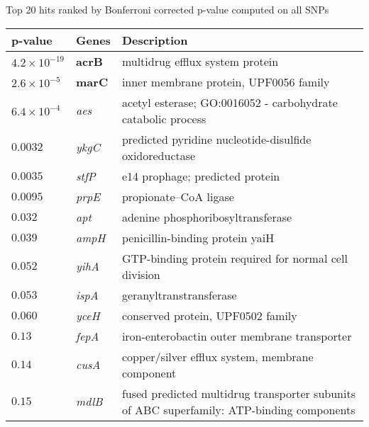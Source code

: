 \documentclass[letterpaper,10pt,english]{howto}
\begin{document}
\begin{threeparttable}
\caption{Top 20 hits ranked by Bonferroni corrected p-value computed on all SNPs}

\begin{tabulary}{\textwidth}{|L|L|L|}
\hline
\textbf{
p-value
} & \textbf{
Genes
} & \textbf{
Description
}\\
\hline

$4.2 \times 10^{-19}$
 & 
\textbf{acrB}
 & 
multidrug efflux system protein
\\

$2.6 \times 10^{-5}$
 & 
\textbf{marC}
 & 
inner membrane protein, UPF0056 family
\\

$6.4 \times 10^{-4}$
 & 
\emph{aes}
 & 
acetyl esterase; GO:0016052 - carbohydrate catabolic process
\\

$0.0032$
 & 
\emph{ykgC}
 & 
predicted pyridine nucleotide-disulfide oxidoreductase
\\

$0.0035$
 & 
\emph{stfP}
 & 
e14 prophage; predicted protein
\\

$0.0095$
 & 
\emph{prpE}
 & 
propionate--CoA ligase
\\

$0.032$
 & 
\emph{apt}
 & 
adenine phosphoribosyltransferase
\\

$0.039$
 & 
\emph{ampH}
 & 
penicillin-binding protein yaiH
\\

$0.052$
 & 
\emph{yihA}
 & 
GTP-binding protein required for normal cell division
\\

$0.053$
 & 
\emph{ispA}
 & 
geranyltranstransferase
\\

$0.060$
 & 
\emph{yceH}
 & 
conserved protein, UPF0502 family
\\

$0.13$
 & 
\emph{fepA}
 & 
iron-enterobactin outer membrane transporter
\\

$0.14$
 & 
\emph{cusA}
 & 
copper/silver efflux system, membrane component
\\

$0.15$
 & 
\emph{mdlB}
 & 
fused predicted multidrug transporter subunits
of ABC superfamily: ATP-binding components
\\


\end{tabulary}
\end{threeparttable}
\end{document}
